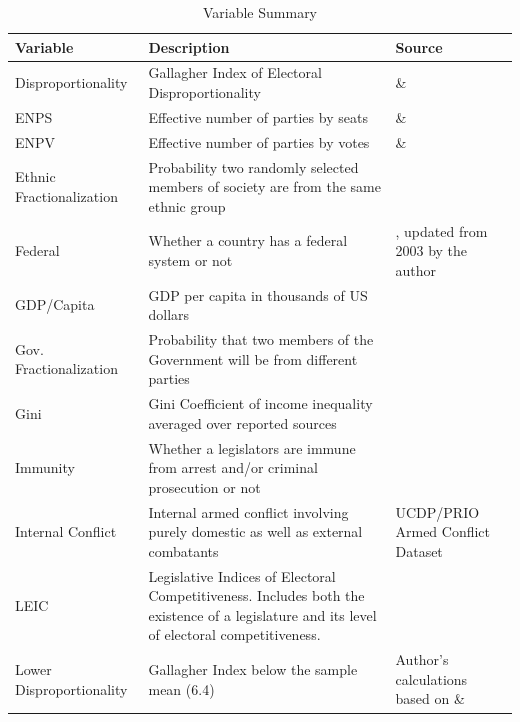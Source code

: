 \documentclass[a4paper]{article}\usepackage[]{graphicx}\usepackage[]{color}
\begin{document}


\begin{table}[!h]
    \begin{center}
    \caption{Variable Summary}
    \label{var_summary}
    \begin{tabular}{l m{7cm} m{3.5cm}}

            \hline
            Variable & Description & Source \\
            \hline \hline
            Disproportionality & Gallagher Index of Electoral Disproportionality & \cite{Gallagher2012} \& \cite{Carey2011} \\
            ENPS & Effective number of parties by seats & \cite{Gallagher2012} \& \cite{Carey2011} \\
            ENPV & Effective number of parties by votes & \cite{Gallagher2012} \& \cite{Carey2011} \\
            Ethnic Fractionalization & Probability two randomly selected members of society are from the same ethnic group & \cite{Alesina2003} \\
            Federal & Whether a country has a federal system or not & \cite{Carey2011}, updated from 2003 by the author \\
            GDP/Capita & GDP per capita in thousands of US dollars & \cite{WorldBank2011} \\
            Gov. Fractionalization & Probability that two members of the Government will be from different parties & \cite{DPI2001} \\
            Gini & Gini Coefficient of income inequality averaged over reported sources & \cite{UNU2008} \\
            Immunity & Whether a legislators are immune from arrest and/or criminal prosecution or not & \cite{Fish2009} \\
            Internal Conflict & Internal armed conflict involving purely domestic as well as external combatants & UCDP/PRIO Armed Conflict Dataset \citep{Themner2014} \\
            LEIC & Legislative Indices of Electoral Competitiveness. Includes both the existence of a legislature and its level of electoral competitiveness. & \cite{DPI2001} \\
            Lower Disproportionality & Gallagher Index below the sample mean (6.4) & Author's calculations based on \cite{Gallagher2012} \& \cite{Carey2011}\\

\end{tabular}
\end{center}
\end{table}
\end{document}
